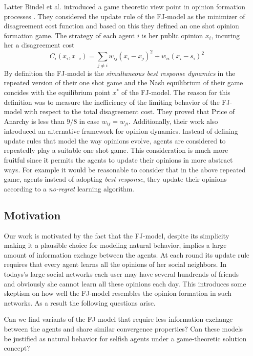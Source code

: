 Latter Bindel et al. introduced a game theoretic
view point in opinion formation processes \cite{BKO11}.
They considered the update rule of the FJ-model
as the minimizer of disagreement cost function
and based on this they defined an one shot
opinion formation game. The strategy of each agent $i$ is
her public opinion $x_i$, incuring her a
disagreement cost \[C_i(x_i,x_{-i})=\sum_{j \neq i}w_{ij}
(x_i-x_j)^2 + w_{ii}(x_i-s_i)^2\]
By definition the FJ-model is the
\emph{simultaneous best response dynamics} in the repeated
version of their one shot game and the Nash equilibrium
of their game concides with the equilibrium point
$x^*$ of the FJ-model. The reason for this definition
was to measure the inefficiency of the limiting behavior
of the FJ-model with respect to the total disagreement cost.
They proved that Price of Anarchy is less than $9/8$
in case $w_{ij}=w_{ji}$. Additionally, their work also introduced
an alternative framework for opinion dynamics.
Instead of defining update rules that model the
way opinions evolve, agents are considered to repeatedly
play a suitable one shot game. This consideration is
much more fruitful since it permits the agents to
update their opinions in more abstract ways.
For example it would be reasonable to consider
that in the above repeated game, agents instead of
adopting \emph{best response}, they update their opinions according
to a \emph{no-regret} learning algorithm.

\subsection{Motivation}
Our work is motivated by the fact that the FJ-model,
despite its simplicity making it a plausible choice
for modeling natural behavior, implies a large amount of
information exchage between the agents. At each round
its update rule requires that every agent learns all the
opinions of her social neighbors.
In todays's large social networks each user
may have several hundrends of friends and obviously
she cannot learn all these opinions each day.
This introduces some skeptism on how well the
FJ-model resembles the opinion formation in such
networks. As a result the following questions arise.

\begin{question}
Can we find variants of the FJ-model that
require less information exchange between the agents
and share similar convergence properties?
Can these models be justified as natural behavior for selfish
agents under a game-theoretic solution concept?
\end{question}

